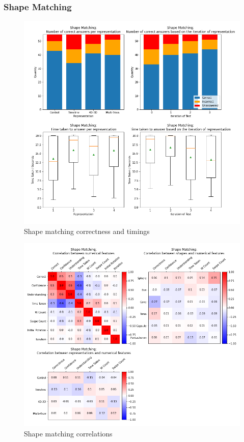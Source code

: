 \documentclass{l4proj}
\begin{document}
\subsubsection{Shape Matching}

\begin{figure}
  \includegraphics[width=\textwidth]{images/results/shape_matching_stats.png}
  \caption{Shape matching correctness and timings}
  \label{fig:shape_stats}
\end{figure}

\begin{figure}
  \includegraphics[width=\textwidth]{images/results/shape_matching_correlations.png}
  \caption{Shape matching correlations}
  \label{fig:shape_corr}
\end{figure}
\end{document}
